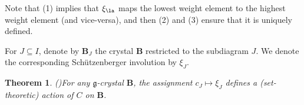 \documentclass[11pt,reqno]{amsart}
\numberwithin{equation}{section}
\newtheorem{Theorem}[equation]{Theorem}
\theoremstyle{definition}
\theoremstyle{named}
\newcommand{\bB}{\mathbf{B}}
\newcommand{\fg}{\mathfrak{g}}
\begin{document}
Note that (1) implies that $\xi_\la$ maps the lowest  weight element to the highest weight element (and vice-versa), and then (2) and (3) ensure that it is uniquely defined.  

For $J \subseteq I$, denote by $\bB_J$ the crystal $\bB$ restricted to the subdiagram $J$.  We denote the corresponding Sch\"utzenberger involution by $\xi_J$. 

\begin{Theorem}(\cite[Theorem 5.19]{HKRW})\label{thm:cactact}
	For any $\fg$-crystal $\bB$, the assignment $c_J \mapsto \xi_{J}$ defines a (set-theoretic) action of $C$ on $\bB$.
\end{Theorem}


\end{document}
